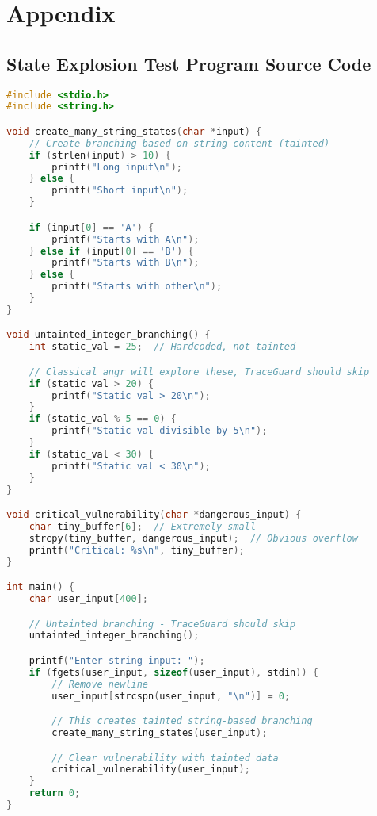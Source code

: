 \chapter{Appendix}

\section{State Explosion Test Program Source Code}

\begin{lstlisting}[language=C, label={lst:state_explosion_test_program}]
#include <stdio.h>
#include <string.h>

void create_many_string_states(char *input) {
    // Create branching based on string content (tainted)
    if (strlen(input) > 10) {
        printf("Long input\n");
    } else {
        printf("Short input\n");
    }

    if (input[0] == 'A') {
        printf("Starts with A\n");
    } else if (input[0] == 'B') {
        printf("Starts with B\n");
    } else {
        printf("Starts with other\n");
    }
}

void untainted_integer_branching() {
    int static_val = 25;  // Hardcoded, not tainted

    // Classical angr will explore these, TraceGuard should skip
    if (static_val > 20) {
        printf("Static val > 20\n");
    }
    if (static_val % 5 == 0) {
        printf("Static val divisible by 5\n");
    }
    if (static_val < 30) {
        printf("Static val < 30\n");
    }
}

void critical_vulnerability(char *dangerous_input) {
    char tiny_buffer[6];  // Extremely small
    strcpy(tiny_buffer, dangerous_input);  // Obvious overflow
    printf("Critical: %s\n", tiny_buffer);
}

int main() {
    char user_input[400];

    // Untainted branching - TraceGuard should skip
    untainted_integer_branching();

    printf("Enter string input: ");
    if (fgets(user_input, sizeof(user_input), stdin)) {
        // Remove newline
        user_input[strcspn(user_input, "\n")] = 0;

        // This creates tainted string-based branching
        create_many_string_states(user_input);

        // Clear vulnerability with tainted data
        critical_vulnerability(user_input);
    }
    return 0;
}
\end{lstlisting}
